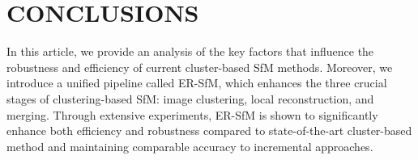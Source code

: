 \documentclass[runningheads]{llncs}
\begin{document}
\section{CONCLUSIONS}
In this article, we provide an analysis of the key factors that influence the robustness and efficiency of current cluster-based SfM methods. Moreover, we introduce a unified pipeline called ER-SfM, which enhances the three crucial stages of clustering-based SfM: image clustering, local reconstruction, and merging. Through extensive experiments, ER-SfM is shown to significantly enhance both efficiency and robustness compared to state-of-the-art cluster-based method and maintaining comparable accuracy to incremental approaches.







%
%









\end{document}
